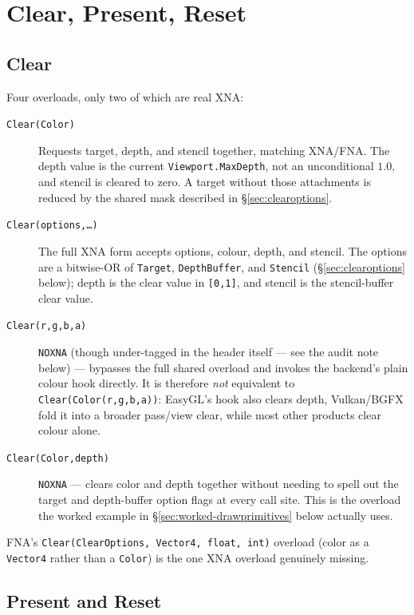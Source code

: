 \section{Clear, Present, Reset}
\label{sec:clear-present-reset}

\subsection{Clear}

Four overloads, only two of which are real XNA:

\begin{description}
\item[\texttt{Clear(Color)}] Requests target, depth, and stencil together, matching XNA/FNA.
  The depth value is the current
  \texttt{Viewport.MaxDepth}, not an unconditional \(1.0\), and stencil is cleared to zero. A
  target without those attachments is reduced by the shared mask described in
  \S\ref{sec:clearoptions}.
\item[\texttt{Clear(options,\ldots)}] The full XNA form accepts options, colour, depth, and
  stencil. The options are a bitwise-OR of \texttt{Target}, \texttt{DepthBuffer}, and
  \texttt{Stencil} (\S\ref{sec:clearoptions} below); depth is the clear value in
  \texttt{[0,1]}, and stencil is the stencil-buffer clear value.
\item[\texttt{Clear(r,g,b,a)}] \texttt{NOXNA} (though under-tagged in the header itself --- see
  the audit note below) --- bypasses the full shared overload and invokes the backend's plain
  colour hook directly. It is therefore \emph{not} equivalent to
  \texttt{Clear(Color(r,g,b,a))}: EasyGL's hook also clears depth, Vulkan/BGFX fold it into a
  broader pass/view clear, while most other products clear colour alone.
\item[\texttt{Clear(Color,depth)}] \texttt{NOXNA} --- clears color and depth together without
  needing to spell out the target and depth-buffer option flags at every call site. This is
  the overload the worked example in \S\ref{sec:worked-drawprimitives} below actually uses.
\end{description}

FNA's \texttt{Clear(ClearOptions, Vector4, float, int)} overload (color as a \texttt{Vector4}
rather than a \texttt{Color}) is the one XNA overload genuinely missing.

\subsection{Present and Reset}

